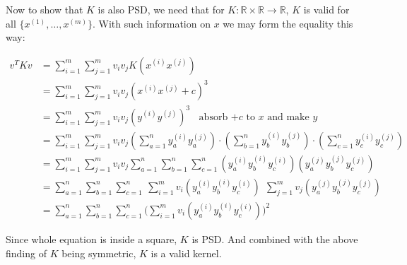 \documentclass[12pt]{article}
\begin{document}
\noindent Now to show that $K$ is also PSD, we need that for $K: \mathbb{R} \times \mathbb{R} \rightarrow \mathbb{R}$, $K$ is valid for all $\{x^{(1)}, \dots, x^{(m)} \}$. With such information on $x$ we may form the equality this way:

\begin{align*}
    v^T K v &= \sum_{i=1}^{m} \sum_{j=1}^{m} v_i v_j K(x^{(i)} x^{(j)}) \\
    &= \sum_{i=1}^{m} \sum_{j=1}^{m} v_i v_j(x^{(i)} x^{(j)} + c)^3 \\
    &= \sum_{i=1}^{m} \sum_{j=1}^{m} v_i v_j(y^{(i)} y^{(j)} )^3 \ \ \ \ \text{absorb $+c$ to $x$ and make $y$} \\
    &= \sum_{i=1}^{m} \sum_{j=1}^{m} v_i v_j (\sum_{a = 1}^{n} y_{a}^{(i)} y_{a}^{(j)}) \cdot (\sum_{b = 1}^{n} y_{b}^{(i)} y_{b}^{(j)}) \cdot (\sum_{c = 1}^{n} y_{c}^{(i)} y_{c}^{(j)}) \\
    &= \sum_{i=1}^{m} \sum_{j=1}^{m} v_i v_j \sum_{a = 1}^{n} \sum_{b = 1}^{n} \sum_{c = 1}^{n} (y_{a}^{(i)} y_{b}^{(i)} y_{c}^{(i)}) (y_{a}^{(j)} y_{b}^{(j)} y_{c}^{(j)}) \\
    &= \sum_{a = 1}^{n} \sum_{b = 1}^{n} \sum_{c = 1}^{n} \ \sum_{i=1}^{m} v_i (y_{a}^{(i)} y_{b}^{(i)} y_{c}^{(i)}) \ \ \sum_{j=1}^{m} v_j (y_{a}^{(j)} y_{b}^{(j)} y_{c}^{(j)}) \\
    &= \sum_{a = 1}^{n} \sum_{b = 1}^{n} \sum_{c = 1}^{n} \big(\sum_{i=1}^{m} v_i (y_{a}^{(i)} y_{b}^{(i)} y_{c}^{(i)})\big)^2
\end{align*}

Since whole equation is inside a square, $K$ is PSD. And combined with the above finding of $K$ being symmetric, $K$ is a valid kernel.
\end{document}
